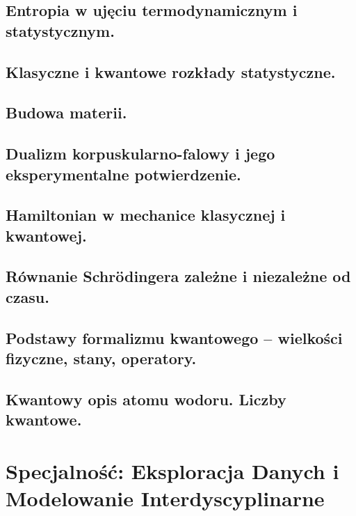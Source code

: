 \documentclass[10pt,a4paper]{article} %
\begin{document}
	\subsection{Entropia w ujęciu termodynamicznym i statystycznym.}
	
	
	\subsection{Klasyczne i kwantowe rozkłady statystyczne.}
	
	
	\subsection{Budowa materii.}
	
	
	\subsection{Dualizm korpuskularno-falowy i jego eksperymentalne potwierdzenie.}
	
	
	\subsection{Hamiltonian w mechanice klasycznej i kwantowej.}
	
	
	\subsection{Równanie Schrödingera zależne i niezależne od czasu.}
	
	
	\subsection{Podstawy formalizmu kwantowego – wielkości fizyczne, stany, operatory.}
	
	
	\subsection{Kwantowy opis atomu wodoru. Liczby kwantowe.}
	
	
    \section{Specjalność: Eksploracja Danych i Modelowanie Interdyscyplinarne}
    
\end{document}
